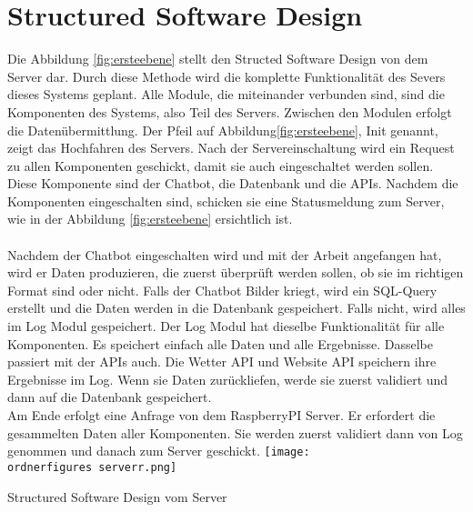 \section{Structured Software Design}

Die Abbildung \ref{fig:ersteebene} stellt den Structed Software Design von dem Server dar. Durch diese Methode wird die komplette Funktionalität des Severs dieses Systems geplant. Alle Module, die miteinander verbunden sind, sind die Komponenten des Systems, also Teil des Servers. Zwischen den Modulen erfolgt die Daten\"ubermittlung. 
Der Pfeil auf Abbildung\ref{fig:ersteebene}, Init genannt, zeigt das Hochfahren des Servers. Nach der Servereinschaltung wird ein Request zu allen Komponenten geschickt, damit sie auch eingeschaltet werden sollen. Diese Komponente sind der Chatbot, die Datenbank und die APIs. 
Nachdem die Komponenten eingeschalten sind, schicken sie eine Statusmeldung zum Server, wie in der Abbildung \ref{fig:ersteebene} ersichtlich ist. \\
\\
Nachdem der Chatbot eingeschalten wird und mit der Arbeit angefangen hat, wird er Daten produzieren, die zuerst überprüft werden sollen, ob sie im richtigen Format sind oder nicht. Falls der Chatbot Bilder kriegt, wird ein SQL-Query erstellt und die Daten werden in die Datenbank gespeichert. Falls nicht, wird alles im Log Modul gespeichert. Der Log Modul hat dieselbe Funktionalität für alle Komponenten. Es speichert einfach alle Daten und alle Ergebnisse.
Dasselbe passiert mit der APIs auch. Die Wetter API und Website API speichern ihre Ergebnisse im Log. Wenn sie Daten zurückliefen, werde sie zuerst validiert und dann auf die Datenbank gespeichert.\\
Am Ende erfolgt eine Anfrage von dem RaspberryPI Server. Er erfordert die gesammelten Daten aller Komponenten. Sie werden zuerst validiert dann von Log genommen und danach zum Server geschickt.
\captionsetup{type=figure}
\texttt{[image: \\ordnerfigures serverr.png]}
\caption{Structured Software Design vom Server}
\label{fig:ersteebene}
